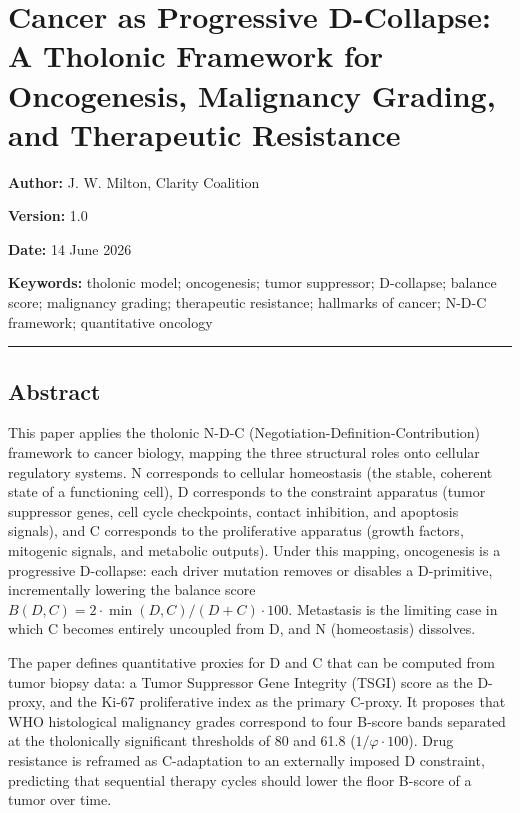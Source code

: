 \documentclass[
  11pt,
  letterpaper,
]{article}
\author{}
\date{}
\begin{document}
\section{Cancer as Progressive D-Collapse: A Tholonic Framework for
Oncogenesis, Malignancy Grading, and Therapeutic
Resistance}\label{cancer-as-progressive-d-collapse-a-tholonic-framework-for-oncogenesis-malignancy-grading-and-therapeutic-resistance}

\textbf{Author:} J. W. Milton, Clarity Coalition

\textbf{Version:} 1.0

\textbf{Date:} 14 June 2026

\textbf{Keywords:} tholonic model; oncogenesis; tumor suppressor;
D-collapse; balance score; malignancy grading; therapeutic resistance;
hallmarks of cancer; N-D-C framework; quantitative oncology

\begin{center}\rule{0.5\linewidth}{0.5pt}\end{center}

\subsection{Abstract}\label{abstract}

This paper applies the tholonic N-D-C
(Negotiation-Definition-Contribution) framework to cancer biology,
mapping the three structural roles onto cellular regulatory systems. N
corresponds to cellular homeostasis (the stable, coherent state of a
functioning cell), D corresponds to the constraint apparatus (tumor
suppressor genes, cell cycle checkpoints, contact inhibition, and
apoptosis signals), and C corresponds to the proliferative apparatus
(growth factors, mitogenic signals, and metabolic outputs). Under this
mapping, oncogenesis is a progressive D-collapse: each driver mutation
removes or disables a D-primitive, incrementally lowering the balance
score \(B(D,C) = 2 \cdot \min(D,C)/(D+C) \cdot 100\). Metastasis is the
limiting case in which C becomes entirely uncoupled from D, and N
(homeostasis) dissolves.

The paper defines quantitative proxies for D and C that can be computed
from tumor biopsy data: a Tumor Suppressor Gene Integrity (TSGI) score
as the D-proxy, and the Ki-67 proliferative index as the primary
C-proxy. It proposes that WHO histological malignancy grades correspond
to four B-score bands separated at the tholonically significant
thresholds of 80 and 61.8 (\(1/\varphi \cdot 100\)). Drug resistance is
reframed as C-adaptation to an externally imposed D constraint,
predicting that sequential therapy cycles should lower the floor B-score
of a tumor over time.
\end{document}
